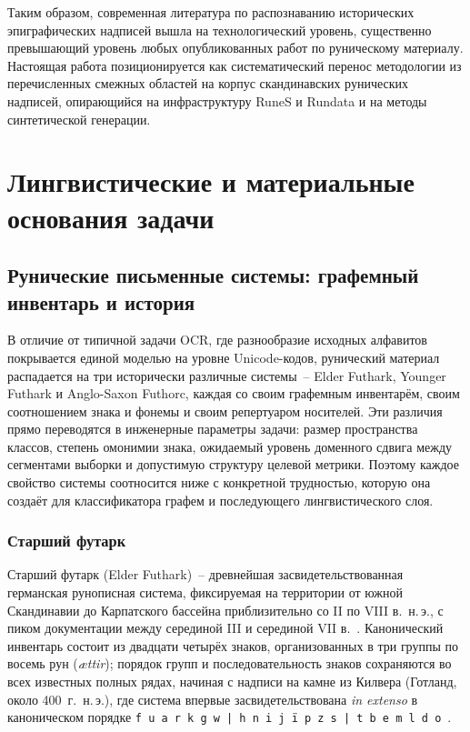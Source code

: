 \documentclass[a4paper,12pt]{extarticle}
\begin{document}
Таким образом, современная литература по распознаванию исторических эпиграфических надписей вышла на технологический уровень, существенно превышающий уровень любых опубликованных работ по руническому материалу. Настоящая работа позиционируется как систематический перенос методологии из перечисленных смежных областей на корпус скандинавских рунических надписей, опирающийся на инфраструктуру RuneS и Rundata и на методы синтетической генерации.

\section{Лингвистические и материальные основания задачи}
\label{sec:foundations}


\subsection{Рунические письменные системы: графемный инвентарь и история}
\label{sec:writing-systems}
 
В отличие от типичной задачи OCR, где разнообразие исходных алфавитов покрывается единой моделью на уровне Unicode-кодов, рунический материал распадается на три исторически различные системы~-- Elder Futhark, Younger Futhark и Anglo-Saxon Futhorc, каждая со своим графемным инвентарём, своим соотношением знака и фонемы и своим репертуаром носителей. Эти различия прямо переводятся в инженерные параметры задачи: размер пространства классов, степень омонимии знака, ожидаемый уровень доменного сдвига между сегментами выборки и допустимую структуру целевой метрики. Поэтому каждое свойство системы соотносится ниже с конкретной трудностью, которую она создаёт для классификатора графем и последующего лингвистического слоя.
 
\subsubsection{Старший футарк}
 
Старший футарк (Elder Futhark)~-- древнейшая засвидетельствованная германская рунописная система, фиксируемая на территории от южной Скандинавии до Карпатского бассейна приблизительно со II по VIII в.\ н.\,э., с пиком документации между серединой III и серединой VII в.~\cite{looijenga2003,duwel2008,barnes2012}. Канонический инвентарь состоит из двадцати четырёх знаков, организованных в три группы по восемь рун (\textit{ættir}); порядок групп и последовательность знаков сохраняются во всех известных полных рядах, начиная с надписи на камне из Килвера (Готланд, около 400~г.\ н.\,э.), где система впервые засвидетельствована \textit{in extenso} в каноническом порядке \texttt{f u \Thorn{} a r k g w | h n i j \"i p z s | t b e m l \Eng{} d o}~\cite{krause1966,antonsen1975}.
 
\end{document}
